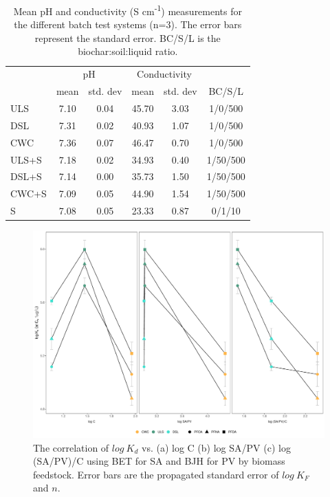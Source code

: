 \begin{table}
\centering
\caption{Mean pH and conductivity (\textmu S cm\textsuperscript{-1}) measurements for the different batch test systems (n=3). The error bars represent the standard error. BC/S/L is the biochar:soil:liquid ratio.}
\label{tab:pHcond}
\begin{tabular}{lccccc}
\toprule
 & \multicolumn{2}{c}{pH} & \multicolumn{2}{c}{Conductivity} & \\ \cline{2-5}
 & mean & std. dev & mean & std. dev & BC/S/L\\ 
\midrule
ULS & 7.10 & 0.04 & 45.70 & 3.03 & 1/0/500\\
DSL & 7.31 & 0.02 & 40.93 & 1.07 & 1/0/500\\
CWC & 7.36 & 0.07 & 46.47 & 0.70 & 1/0/500\\
ULS+S & 7.18 & 0.02 & 34.93 & 0.40 & 1/50/500\\
DSL+S & 7.14 & 0.00 & 35.73 & 1.50 & 1/50/500\\
CWC+S & 7.09 & 0.05 & 44.90 & 1.54 & 1/50/500\\
S & 7.08 & 0.05 & 23.33 & 0.87 & 0/1/10\\
\bottomrule
\end{tabular}
\end{table}

\begin{figure}[htb]
    \centering
    \includegraphics[width=\textwidth]{R/figs/SAPV_C_Kd1ugL_plot.pdf}
    \caption{The correlation of $log~K_d$ vs. (a) log C (b) log SA/PV (c) log (SA/PV)/C using BET for SA and BJH for PV by biomass feedstock. Error bars are the propagated standard error of $log~K_F$ and $n$.}
    \label{fig:Kd_SAPV_C}
\end{figure}


